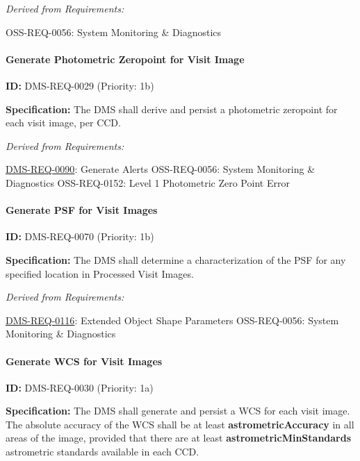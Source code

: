 \documentclass[SE,toc,lsstdraft]{lsstdoc}
\begin{document}
\emph{Derived from Requirements:}

OSS-REQ-0056:
System Monitoring \& Diagnostics \newline

\paragraph{Generate Photometric Zeropoint for Visit Image}\hfill  %

\label{DMS-REQ-0029}
\textbf{ID:} DMS-REQ-0029 (Priority: 1b)

\textbf{Specification:} The DMS shall derive and persist a photometric zeropoint for each visit image, per CCD.

\emph{Derived from Requirements:}

\hyperref[DMS-REQ-0090]{DMS-REQ-0090}:
Generate Alerts \newline
OSS-REQ-0056:
System Monitoring \& Diagnostics \newline
OSS-REQ-0152:
Level 1 Photometric Zero Point Error \newline

\paragraph{Generate PSF for Visit Images}\hfill  %

\label{DMS-REQ-0070}
\textbf{ID:} DMS-REQ-0070 (Priority: 1b)

\textbf{Specification:} The DMS shall determine a characterization of the PSF for any specified location in Processed Visit Images.

\emph{Derived from Requirements:}

\hyperref[DMS-REQ-0116]{DMS-REQ-0116}:
Extended Object Shape Parameters \newline
OSS-REQ-0056:
System Monitoring \& Diagnostics \newline

\paragraph{Generate WCS for Visit Images}\hfill  %

\label{DMS-REQ-0030}
\textbf{ID:} DMS-REQ-0030 (Priority: 1a)

\textbf{Specification:} The DMS shall generate and persist a WCS for each visit image.  The absolute accuracy of the WCS shall be at least \textbf{astrometricAccuracy} in all areas of the image, provided that there are at least \textbf{astrometricMinStandards} astrometric standards available in each CCD.
\end{document}
